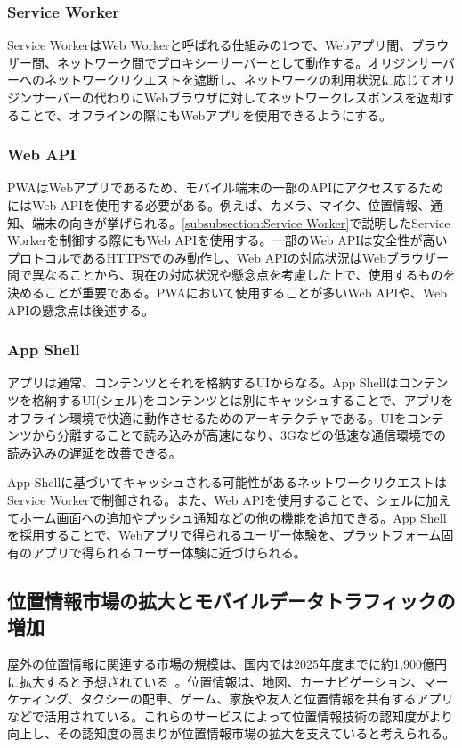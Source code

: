 \subsubsection{Service Worker}\label{subsubsection:Service Worker}
Service WorkerはWeb Workerと呼ばれる仕組みの1つで、Webアプリ間、ブラウザー間、ネットワーク間でプロキシーサーバーとして動作する。オリジンサーバーへのネットワークリクエストを遮断し、ネットワークの利用状況に応じてオリジンサーバーの代わりにWebブラウザに対してネットワークレスポンスを返却することで、オフラインの際にもWebアプリを使用できるようにする。
\subsubsection{Web API}\label{subsubsection:Web API}
PWAはWebアプリであるため、モバイル端末の一部のAPIにアクセスするためにはWeb APIを使用する必要がある。例えば、カメラ、マイク、位置情報、通知、端末の向きが挙げられる。\autoref{subsubsection:Service Worker}で説明したService Workerを制御する際にもWeb APIを使用する。一部のWeb APIは安全性が高いプロトコルであるHTTPSでのみ動作し、Web APIの対応状況はWebブラウザー間で異なることから、現在の対応状況や懸念点を考慮した上で、使用するものを決めることが重要である。PWAにおいて使用することが多いWeb APIや、Web APIの懸念点は後述する。
\subsubsection{App Shell}\label{subsubsection:App Shell}
アプリは通常、コンテンツとそれを格納するUIからなる。App Shellはコンテンツを格納するUI(シェル)をコンテンツとは別にキャッシュすることで、アプリをオフライン環境で快適に動作させるためのアーキテクチャである。UIをコンテンツから分離することで読み込みが高速になり、3Gなどの低速な通信環境での読み込みの遅延を改善できる。

App Shellに基づいてキャッシュされる可能性があるネットワークリクエストはService Workerで制御される。また、Web APIを使用することで、シェルに加えてホーム画面への追加やプッシュ通知などの他の機能を追加できる。App Shellを採用することで、Webアプリで得られるユーザー体験を、プラットフォーム固有のアプリで得られるユーザー体験に近づけられる。
\subsection{位置情報市場の拡大とモバイルデータトラフィックの増加}
屋外の位置情報に関連する市場の規模は、国内では2025年度までに約1,900億円に拡大すると予想されている~\cite{MICInformationStatistics2023}。位置情報は、地図、カーナビゲーション、マーケティング、タクシーの配車、ゲーム、家族や友人と位置情報を共有するアプリなどで活用されている。これらのサービスによって位置情報技術の認知度がより向上し、その認知度の高まりが位置情報市場の拡大を支えていると考えられる。

